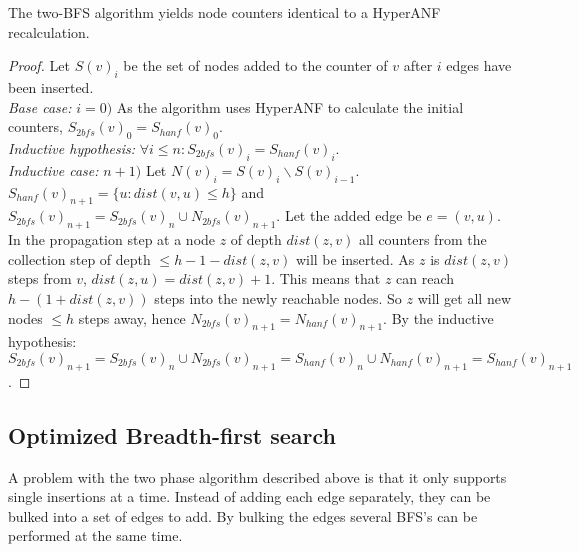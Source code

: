 \begin{theorem} The two-BFS algorithm yields node counters identical to a HyperANF recalculation.

\begin{proof}Let $S(v)_i$ be the set of nodes added to the counter of $v$ after $i$ edges have been inserted.\\

\noindent\textit{Base case:} $i = 0)$ As the algorithm uses HyperANF to calculate the initial counters, $S_{2bfs}(v)_0 = S_{hanf}(v)_0$.\\

\noindent\textit{Inductive hypothesis: } $\forall i \leq n : S_{2bfs}(v)_i = S_{hanf}(v)_i$.\\

\noindent\textit{Inductive case: } $n + 1)$ Let $N(v)_i = S(v)_i \backslash S(v)_{i-1}$.  $S_{hanf}(v)_{n+1} = \{ u : dist(v,u) \leq h \}$ and $S_{2bfs}(v)_{n+1} = S_{2bfs}(v)_{n} \cup N_{2bfs}(v)_{n+1}$. Let the added edge be $e = (v,u)$. In the propagation step at a node $z$ of depth $dist(z,v)$ all counters from the collection step of depth $\leq h-1-dist(z,v)$ will be inserted. As $z$ is $dist(z,v)$ steps from $v$, $dist(z,u) = dist(z,v) + 1$. This means that $z$ can reach $h-(1+dist(z,v))$ steps into the newly reachable nodes. So $z$ will get all new nodes $\leq h$ steps away, hence $N_{2bfs}(v)_{n+1} = N_{hanf}(v)_{n+1}$. By the inductive hypothesis: $S_{2bfs}(v)_{n+1} = S_{2bfs}(v)_n \cup N_{2bfs}(v)_{n+1} = S_{hanf}(v)_n \cup N_{hanf}(v)_{n+1} = S_{hanf}(v)_{n+1}$.

\end{proof}
\end{theorem}

\subsection{Optimized Breadth-first search}

A problem with the two phase algorithm described above is that it only supports single insertions at a time. Instead of adding each edge separately, they can be bulked into a set of edges to add. By bulking the edges several BFS's can be performed at the same time. 

